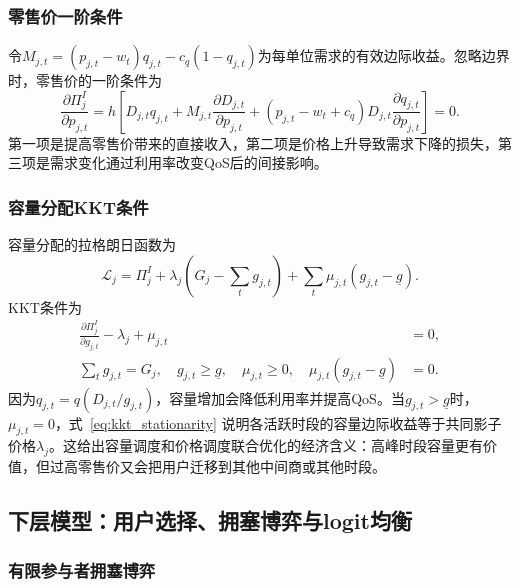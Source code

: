 \documentclass[UTF8,11pt]{ctexart}
\newcommand{\qos}{q}
\newcommand{\D}{D}
\begin{document}
\subsubsection{零售价一阶条件}

令$M_{j,t}=(p_{j,t}-w_t)q_{j,t}-c_q(1-q_{j,t})$为每单位需求的有效边际收益。忽略边界时，零售价的一阶条件为
\begin{equation}
  \frac{\partial\Pi^I_j}{\partial p_{j,t}}
  =h\left[
  \D_{j,t}q_{j,t}
  +M_{j,t}\frac{\partial \D_{j,t}}{\partial p_{j,t}}
  +(p_{j,t}-w_t+c_q)\D_{j,t}\frac{\partial q_{j,t}}{\partial p_{j,t}}
  \right]=0.
  \label{eq:retail_foc}
\end{equation}
第一项是提高零售价带来的直接收入，第二项是价格上升导致需求下降的损失，第三项是需求变化通过利用率改变QoS后的间接影响。

\subsubsection{容量分配KKT条件}

容量分配的拉格朗日函数为
\begin{equation}
  \mathcal{L}_j=\Pi^I_j+\lambda_j\left(G_j-\sum_t g_{j,t}\right)
  +\sum_t \mu_{j,t}(g_{j,t}-\underline g).
  \label{eq:broker_lagrangian}
\end{equation}
KKT条件为
\begin{align}
  \frac{\partial\Pi^I_j}{\partial g_{j,t}}-\lambda_j+\mu_{j,t}&=0,
  \label{eq:kkt_stationarity}\\
  \sum_t g_{j,t}=G_j,\quad g_{j,t}\ge \underline g,\quad \mu_{j,t}\ge 0,\quad
  \mu_{j,t}(g_{j,t}-\underline g)&=0. \label{eq:kkt_complementarity}
\end{align}
因为$q_{j,t}=\qos(\D_{j,t}/g_{j,t})$，容量增加会降低利用率并提高QoS。当$g_{j,t}>\underline g$时，$\mu_{j,t}=0$，式~\eqref{eq:kkt_stationarity} 说明各活跃时段的容量边际收益等于共同影子价格$\lambda_j$。这给出容量调度和价格调度联合优化的经济含义：高峰时段容量更有价值，但过高零售价又会把用户迁移到其他中间商或其他时段。

\subsection{下层模型：用户选择、拥塞博弈与logit均衡}
\label{sec:lower_user}

\subsubsection{有限参与者拥塞博弈}
\end{document}
